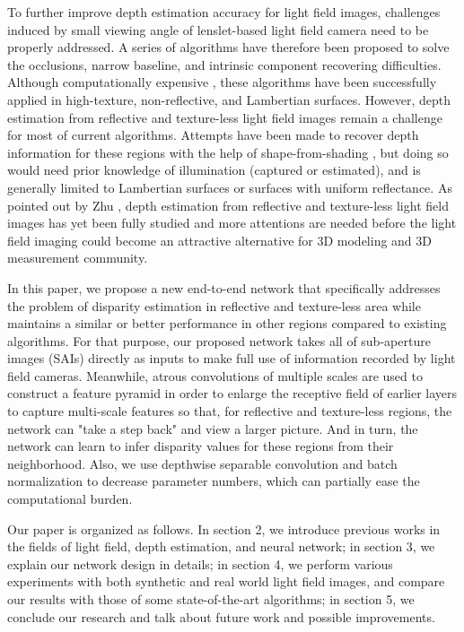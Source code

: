 \documentclass[10pt,twocolumn,letterpaper]{article}
\begin{document}
	To further improve depth estimation accuracy for light field images, challenges induced by small viewing angle of lenslet-based light field camera need to be properly addressed.  A series of algorithms have therefore been proposed to solve the occlusions\cite{zhang2016robust, sheng2018occlusion, schilling2018trust}, narrow baseline\cite{jeon2015accurate}, and intrinsic component recovering\cite{alperovich2018light} difficulties. Although computationally expensive \cite{johannsen2017taxonomy}, these algorithms have been successfully applied in high-texture, non-reflective, and Lambertian surfaces. However, depth estimation from reflective and texture-less light field images remain a challenge for most of current algorithms. Attempts have been made to recover depth information for these regions with the help of shape-from-shading \cite{wu2011high, langguth2016shading, oxholm2014multiview}, but doing so would need prior knowledge of illumination (captured or estimated), and is generally limited to Lambertian surfaces or surfaces with uniform reflectance\cite{cui2017polarimetric}.  As pointed out by Zhu \etal\cite{zhu2017}, depth estimation from reflective and texture-less light field images has yet been fully studied and more attentions are needed before the light field imaging could become an attractive alternative for 3D modeling and 3D measurement community.
	
	In this paper, we propose a new end-to-end network that specifically addresses the problem of disparity estimation in reflective and texture-less area while maintains a similar or better performance in other regions compared to existing algorithms. For that purpose, our proposed network takes all of sub-aperture images (SAIs) directly as inputs to make full use of information recorded by light field cameras. Meanwhile, atrous convolutions of multiple scales are used to construct a feature pyramid in order to enlarge the receptive field of earlier layers to capture multi-scale features so that, for reflective and texture-less regions, the network can "take a step back" and view a larger picture. And in turn, the network can learn to infer disparity values for these regions from their neighborhood. Also, we use depthwise separable convolution and batch normalization to decrease parameter numbers, which can partially ease the computational burden.
	
	Our paper is organized as follows. In section 2, we introduce previous works in the fields of light field, depth estimation, and neural network; in section 3, we explain our network design in details; in section 4, we perform various experiments with both synthetic and real world light field images, and compare our results with those of some state-of-the-art algorithms; in section 5, we conclude our research and talk about future work and possible improvements.
\end{document}
